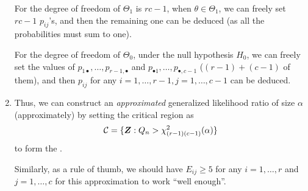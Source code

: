 \begin{enumerate}
\begin{note}
For the degree of freedom of \(\Theta_1\) is \(rc-1\), when
\(\theta\in\Theta_1\), we can freely set \(rc-1\) \(p_{ij}\)'s, and then the
remaining one can be deduced (as all the probabilities must sum to one).

For the degree of freedom of \(\Theta_0\), under the null hypothesis \(H_0\),
we can freely set the values of
\(p_{1\bullet},\dotsc,p_{r-1,\bullet}\) and \(p_{\bullet 1},\dotsc,p_{\bullet,
c-1}\) (\((r-1)+(c-1)\) of them), and then \(p_{ij}\) for any
\(i=1,\dotsc,r-1,j=1,\dotsc,c-1\) can be deduced.
\end{note}
\item Thus, we can construct an \emph{approximated} generalized likelihood
ratio of size \(\alpha\) (approximately) by setting the critical region as
\[
\mathcal{C}=\{\vb*{Z}:Q_n>\chi^2_{(r-1)(c-1)}(\alpha)\}
\]
to form the .

\begin{note}
Similarly, as a rule of thumb, we should have \(E_{ij}\ge 5\) for any
\(i=1,\dotsc,r\) and \(j=1,\dotsc,c\) for this approximation to work ``well
enough''.
\end{note}
\end{enumerate}
